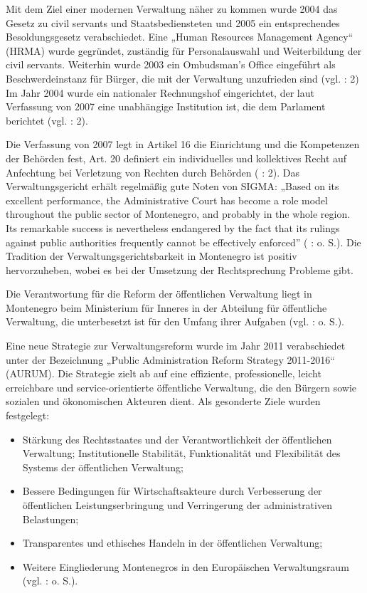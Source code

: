 Mit dem Ziel einer modernen Verwaltung näher zu kommen wurde 2004 das Gesetz zu civil servants und Staatsbediensteten und 2005 ein entsprechendes Besoldungsgesetz verabschiedet. Eine „Human Resources Management Agency“ (HRMA) wurde gegründet, zuständig für Personalauswahl und Weiterbildung der civil servants. Weiterhin wurde 2003 ein Ombudsman’s Office eingeführt als Beschwerdeinstanz für Bürger, die mit der Verwaltung unzufrieden sind (vgl. \cite{freund07} : 2) Im Jahr 2004 wurde ein nationaler Rechnungshof eingerichtet, der laut Verfassung von 2007 eine unabhängige Institution ist, die dem Parlament berichtet (vgl. \cite{oecd08b} : 2).\par
Die Verfassung von 2007 legt in Artikel 16 die Einrichtung und die Kompetenzen der Behörden fest, Art. 20 definiert ein individuelles und kollektives Recht auf Anfechtung bei Verletzung von Rechten durch Behörden (\cite{oecd08b} : 2). Das Verwaltungsgericht erhält regelmäßig gute Noten von SIGMA: „Based on its excellent performance, the Administrative Court has become a role model throughout the public sector of Montenegro, and probably in the whole region. Its remarkable success is nevertheless endangered by the fact that its rulings against public authorities frequently cannot be effectively enforced” (\cite{oecd11a} :  o. S.). Die Tradition der Verwaltungsgerichtsbarkeit in Montenegro ist positiv hervorzuheben, wobei es bei der Umsetzung der Rechtsprechung Probleme gibt. \par
Die Verantwortung für die Reform der öffentlichen Verwaltung liegt in Montenegro beim Ministerium für Inneres in der Abteilung für öffentliche Verwaltung, die unterbesetzt ist für den Umfang ihrer Aufgaben (vgl. \cite{oecd11a} :  o. S.).\par
Eine neue Strategie zur Verwaltungsreform wurde im Jahr 2011 verabschiedet unter der Bezeichnung „Public Administration Reform Strategy 2011-2016“ (AURUM). Die Strategie zielt ab auf eine effiziente, professionelle, leicht erreichbare und service-orientierte öffentliche Verwaltung, die den Bürgern sowie sozialen und ökonomischen Akteuren dient. Als gesonderte Ziele wurden festgelegt:
\begin{itemize} \itemsep1pt \parskip0pt 
\item Stärkung des Rechtsstaates und der Verantwortlichkeit der öffentlichen Verwaltung;
Institutionelle Stabilität, Funktionalität und Flexibilität des Systems der öffentlichen Verwaltung; 
\item Bessere Bedingungen für Wirtschaftsakteure durch Verbesserung der öffentlichen Leistungserbringung und Verringerung der administrativen Belastungen; 
\item Transparentes und ethisches Handeln in der öffentlichen Verwaltung; 
\item Weitere Eingliederung Montenegros in den Europäischen Verwaltungsraum (vgl. \cite{govmont11} :  o. S.).
\end{itemize}

